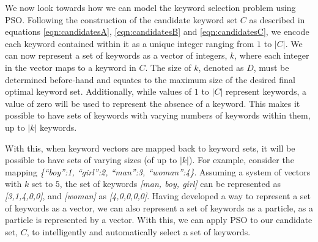 \documentclass[runningheads]{llncs}
\begin{document}
We now look towards how we can model the keyword selection problem using PSO. Following the construction of the candidate keyword set $C$ as described in equations \ref{eqn:candidatesA}, \ref{eqn:candidatesB} and \ref{eqn:candidatesC}, we encode each keyword contained within it as a unique integer ranging from $1$ to $|C|$. We can now represent a set of keywords as a vector of integers, $k$, where each integer in the vector maps to a keyword in $C$. The size of $k$, denoted as $D$, must be determined before-hand and equates to the maximum size of the desired final optimal keyword set. Additionally, while values of $1$ to $|C|$ represent keywords, a value of zero will be used to represent the absence of a keyword. This makes it possible to have sets of keywords with varying numbers of keywords within them, up to $|k|$ keywords.

With this, when keyword vectors are mapped back to keyword sets, it will be possible to have sets of varying sizes (of up to $|k|$). For example, consider the mapping \textit{\{``boy'':1, ``girl'':2, ``man'':3, ``woman'':4\}}. Assuming a system of vectors with $k$ set to $5$, the set of keywords \textit{[man, boy, girl]} can be represented as \textit{[3,1,4,0,0]}, and \textit{[woman]} as \textit{[4,0,0,0,0]}. Having developed a way to represent a set of keywords as a vector, we can also represent a set of keywords as a particle, as a particle is represented by a vector. With this, we can apply PSO to our candidate set, $C$, to intelligently and automatically select a set of keywords.
\end{document}
